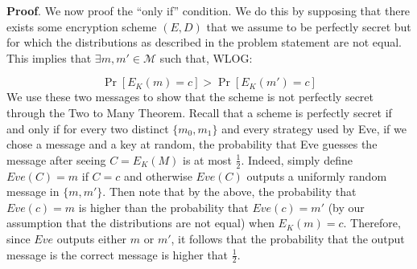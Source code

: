 \documentclass{article}
\begin{document}
\begin{enumerate}[noitemsep,topsep=\mdcompacttopsep,start=4]
\begin{mdbmarginx}{1ex}{0pt}{1ex}{0pt}%
\noindent{}\textbf{Proof}.  We now proof the \textquotedblleft{}only if\textquotedblright{} condition. We do this by supposing that there exists some encryption scheme $(E,D)$
that we assume to be perfectly secret but for which the distributions as described in the problem statement are
not equal. This implies that $\exists m,m' \in \mathcal{M}$ such that, WLOG:%
\end{mdbmarginx}%
\noindent\noindent\[%
\Pr[E_K(m) = c] > \Pr[E_K(m') = c]
\]%
We use these two messages to show that the scheme is not perfectly secret through the Two to Many Theorem. Recall 
that a scheme is perfectly secret if and only if for every two distinct $\{m_0,m_1\}$ and every strategy used 
by Eve, if we chose a message and a key at random, the probability that Eve guesses the message after seeing 
$C = E_K(M)$ is at most $\frac{1}{2}$. Indeed, simply define $Eve(C) = m$ if $C = c$ and otherwise $Eve(C)$ outputs a uniformly random
message in $\{m,m'\}$. Then note that by the above, the probability that $Eve(c) = m$ is higher than the probability that
$Eve(c) = m'$ (by our assumption that the distributions are not equal) when $E_K(m) = c$. Therefore, since $Eve$ outputs either
$m$ or $m'$, it follows that the probability that the output message is the correct message is higher that $\frac{1}{2}$.
\mdfloatright{\ensuremath{\Box}}%


\end{enumerate}
\end{document}

